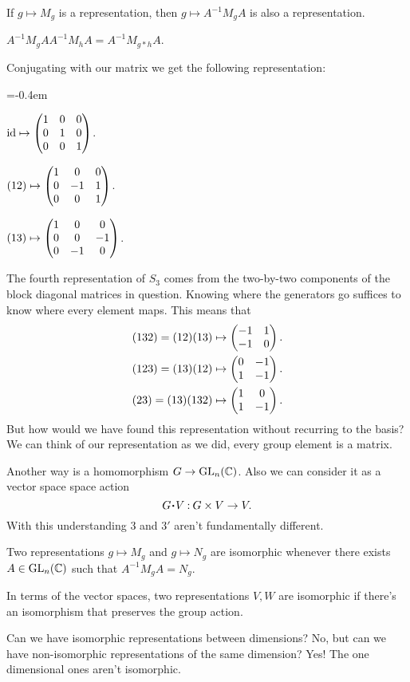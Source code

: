 \documentclass[12pt]{memoir}
\begin{document}
\begin{Lem}
    If $g\mapsto M_g$ is a representation, then $g\mapsto A^{-1}M_gA$ is also a representation.
\end{Lem}

\begin{ptcbp}
    $A^{-1}M_gAA^{-1}M_hA=A^{-1}M_{g\ast h}A$. 
\end{ptcbp}

Conjugating with our matrix we get the following representation:
\begin{itemize}\begin{multicols}{3}
    \itemsep=-0.4em
\item $\operatorname{id}\mapsto \begin{pmatrix} 1 & 0 & 0 \\ 0 & 1 & 0 \\ 0 & 0 & 1 \end{pmatrix}$.     
\item $(12)\mapsto \begin{pmatrix} 1 & 0 & 0 \\ 0 & -1 & 1 \\ 0 & 0 & 1 \end{pmatrix}$.       
\item $(13)\mapsto \begin{pmatrix} 1 & 0 & 0 \\ 0 & 0 & -1 \\ 0 & -1 & 0 \end{pmatrix}$.              
\end{multicols}
\end{itemize}

The fourth representation of $S_3$ comes from the two-by-two components of the block diagonal matrices in question. Knowing where the generators go suffices to know where every element maps. This means that 
\begin{align*}
    &(132)=(12)(13)\mapsto\begin{pmatrix} -1 & 1 \\ -1 & 0 \end{pmatrix}.\\
    &(123)=(13)(12)\mapsto\begin{pmatrix} 0 & -1 \\ 1 & -1 \end{pmatrix}.\\
    &(23)=(13)(132)\mapsto\begin{pmatrix} 1 & 0 \\ 1 & -1 \end{pmatrix}.
\end{align*}
But how would we have found this representation without recurring to the basis? We can think of our representation as we did, every group element is a matrix.\par 
Another way is a homomorphism $G\to\operatorname{GL}_n(\mathbb{C})$. Also we can consider it as a vector space space action 
$$G\.V\: G\x V\to V.$$
With this understanding $3$ and $3'$ aren't fundamentally different.

\begin{Def}
Two representations $g\mapsto M_g$ and $g\mapsto N_g$ are isomorphic whenever there exists $A\in\operatorname{GL}_n(\mathbb{C})$ such that $A^{-1}M_gA=N_g$.\par 
In terms of the vector spaces, two representations $V,W$ are isomorphic if there's an isomorphism that preserves the group action. 
\end{Def}

Can we have isomorphic representations between dimensions? No, but can we have non-isomorphic representations of the same dimension? Yes! The one dimensional ones aren't isomorphic.
\end{document}
